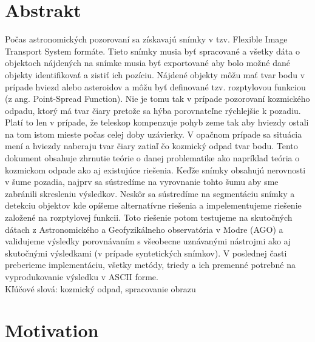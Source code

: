 \documentclass[12pt, a4paper, oneside]{book}
\begin{document}
\chapter*{Abstrakt}\label{chap:abstract_sk}
Počas astronomických pozorovaní sa získavajú snímky v tzv. Flexible Image Transport System formáte.
Tieto snímky musia byť spracované a všetky dáta o objektoch nájdených na snímke musia byť exportované aby bolo možné dané objekty identifikovať a zistiť ich pozíciu.
Nájdené objekty môžu mať tvar bodu v prípade hviezd alebo asteroidov a môžu byť definované tzv. rozptylovou funkciou (z ang. Point-Spread Function).
Nie je tomu tak v prípade pozorovaní kozmického odpadu, ktorý má tvar čiary pretože sa hýba porovnateľne rýchlejšie k pozadiu.
Platí to len v prípade, že teleskop kompenzuje pohyb zeme tak aby hviezdy ostali na tom istom mieste počas celej doby uzávierky.
V opačnom prípade sa situácia mení a hviezdy naberaju tvar čiary zatiaľ čo kozmický odpad tvar bodu.
Tento dokument obsahuje zhrnutie teórie o danej problematike ako napríklad teória o kozmickom odpade ako aj existujúce riešenia.
Keďže snímky obsahujú nerovnosti v šume pozadia, najprv sa sústredíme na vyrovnanie tohto šumu aby sme zabránili skresleniu výsledkov.
Neskôr sa sústredíme na segmentáciu snímky a detekciu objektov kde opíšeme alternatívne riešenia a impelementujeme riešenie založené na rozptylovej funkcii.
Toto riešenie potom testujeme na skutočných dátach z Astronomického a Geofyzikálneho observatória v Modre (AGO) a validujeme výsledky porovnávaním s všeobecne uznávanými nástrojmi ako aj skutočnými výsledkami (v prípade syntetických snímkov).
V poslednej časti preberieme implementáciu, všetky metódy, triedy a ich premenné potrebné na vyprodukovanie výsledku v ASCII forme.
~\\
Kľúčové slová: kozmický odpad, spracovanie obrazu
\vfill\eject


\tableofcontents
\mainmatter

\pagestyle{headings}

\chapter{Motivation}
\end{document}
